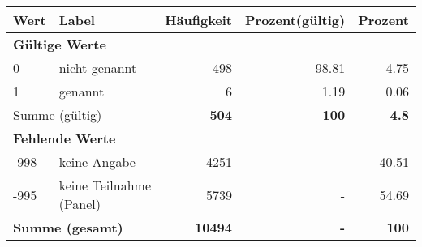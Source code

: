      \begin{longtable}{lXrrr}
     \toprule
     \textbf{Wert} & \textbf{Label} & \textbf{Häufigkeit} & \textbf{Prozent(gültig)} & \textbf{Prozent} \\
     \endhead
     \midrule
     \multicolumn{5}{l}{\textbf{Gültige Werte}}\\

     0 &
     \multicolumn{1}{X}{ nicht genannt   } &


       \num{498} &
       \num[round-mode=places,round-precision=2]{98.81} &
         \num[round-mode=places,round-precision=2]{4.75} \\

     1 &
     \multicolumn{1}{X}{ genannt   } &


       \num{6} &
       \num[round-mode=places,round-precision=2]{1.19} &
         \num[round-mode=places,round-precision=2]{0.06} \\
     \midrule
     \multicolumn{2}{l}{Summe (gültig)} &
       \textbf{\num{504}} &
     \textbf{\num{100}} &
       \textbf{\num[round-mode=places,round-precision=2]{4.8}} \\
     \multicolumn{5}{l}{\textbf{Fehlende Werte}}\\
       -998 &
       keine Angabe &
         \num{4251} &
        - &
         \num[round-mode=places,round-precision=2]{40.51} \\
       -995 &
       keine Teilnahme (Panel) &
         \num{5739} &
        - &
         \num[round-mode=places,round-precision=2]{54.69} \\
     \midrule
     \multicolumn{2}{l}{\textbf{Summe (gesamt)}} &
          \textbf{\num{10494}} &
        \textbf{-} &
        \textbf{\num{100}} \\
     \bottomrule
     \end{longtable}
     
